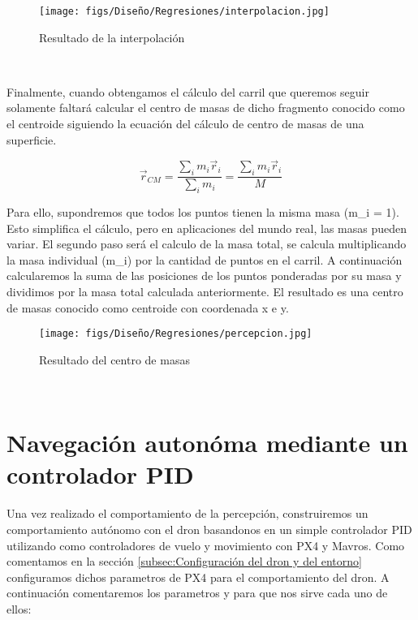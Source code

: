   \begin{figure} [H]
    \begin{center}
      \texttt{[image: figs/Diseño/Regresiones/interpolacion.jpg]}
    \end{center}
    \caption{Resultado de la interpolación}
    \label{fig:interpolación}
  \end{figure}\

  Finalmente, cuando obtengamos el cálculo del carril que queremos seguir solamente faltará calcular el centro de masas de dicho fragmento conocido como el centroide siguiendo la ecuación
  del cálculo de centro de masas de una superficie.

  \begin{equation} 
    \vec{r}_{CM} = \frac{\sum_{i}m_{i} \vec{r}_{i}}{\sum_{i}m_{i}} = \frac{\sum_{i}m_{i} \vec{r}_{i}}{M} 
  \end{equation} 
 
  
  Para ello, 
  supondremos que todos los puntos tienen la misma masa (m\_i = 1). Esto simplifica el cálculo, pero en aplicaciones del mundo real, las masas pueden variar.
  El segundo paso será el calculo de la masa total, se calcula multiplicando la masa individual (m\_i) por la cantidad de puntos en el carril. A continuación calcularemos
  la suma de las posiciones de los puntos ponderadas por su masa y dividimos por la masa total calculada anteriormente. El resultado es una centro de masas conocido como centroide
  con coordenada x e y. 

  \begin{figure} [H]
    \begin{center}
      \texttt{[image: figs/Diseño/Regresiones/percepcion.jpg]}
    \end{center}
    \caption{Resultado del centro de masas}
    \label{fig:centro de masas}
  \end{figure}\

  \section{Navegación autonóma mediante un controlador PID}
  \label{sec:Control}

  Una vez realizado el comportamiento de la percepción, construiremos un comportamiento autónomo con el dron basandonos en un simple controlador PID utilizando como controladores de vuelo
  y movimiento con PX4 y Mavros. 
  Como comentamos en la sección \ref{subsec:Configuración del dron y del entorno} configuramos dichos parametros de PX4 para el comportamiento del dron. A continuación comentaremos los parametros
  y para que nos sirve cada uno de ellos:

